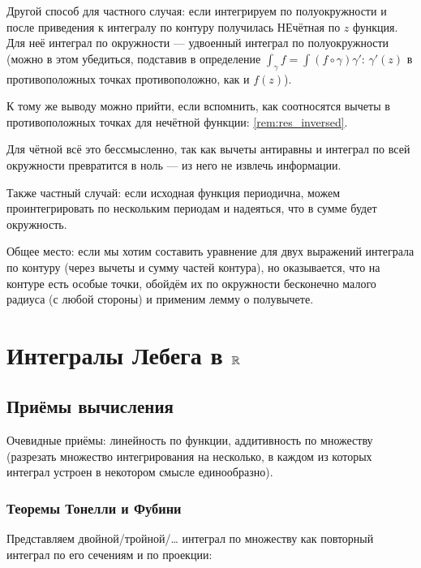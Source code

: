 \documentclass[12pt, a4paper]{article}
\begin{document}
\begin{remark}
  Другой способ для частного случая: если интегрируем по полуокружности и после приведения к интегралу по контуру получилась НЕчётная по $z$ функция.
  Для неё интеграл по окружности — удвоенный интеграл по полуокружности (можно в этом убедиться, подставив в определение $\int_\gamma f = \int (f \circ \gamma) \gamma'$: 
  $\gamma'(z)$ в противоположных точках противоположно, как и $f(z)$).

  К тому же выводу можно прийти, если вспомнить, как соотносятся вычеты в противоположных точках для нечётной функции: \ref{rem:res_inversed}.

  Для чётной всё это бессмысленно, так как вычеты антиравны и интеграл по всей окружности превратится в ноль — из него не извлечь информации.
\end{remark}

\begin{remark}
  Также частный случай: если исходная функция периодична, можем проинтегрировать по нескольким периодам и надеяться, что в сумме будет окружность.
\end{remark}

Общее место: если мы хотим составить уравнение для двух выражений интеграла по контуру (через вычеты и сумму частей контура), 
но оказывается, что на контуре есть особые точки, обойдём их по окружности бесконечно малого радиуса (с любой стороны) и применим лемму о полувычете.


\section{Интегралы Лебега в ${\mathbb{R}}$}

\subsection{Приёмы вычисления}

Очевидные приёмы: 
линейность по функции, 
аддитивность по множеству (разрезать множество интегрирования на несколько,
в каждом из которых интеграл устроен в некотором смысле единообразно).

\subsubsection{Теоремы Тонелли и Фубини}

Представляем двойной/тройной/… интеграл по множеству как повторный интеграл по его сечениям и по проекции:
\end{document}
